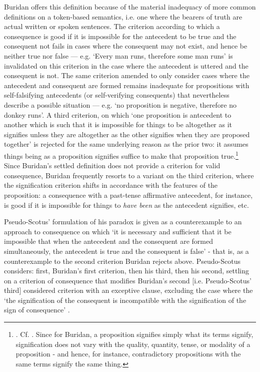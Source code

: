 	Buridan offers this definition because of the material inadequacy of more common definitions on a token-based semantics, i.e. one where the bearers of truth are actual written or spoken sentences. The criterion according to which a consequence is good if it is impossible for the antecedent to be true and the consequent not fails in cases where the consequent may not exist, and hence be neither true nor false --- e.g. `Every man runs, therefore some man runs' is invalidated on this criterion in the case where the antecedent is uttered and the consequent is not. The same criterion amended to only consider cases where the antecedent and consequent are formed remains inadequate for propositions with self-falsifying antecedents (or self-verifying consequents) that nevertheless describe a possible situation --- e.g. `no proposition is negative, therefore no donkey runs'. A third criterion, on which `one proposition is antecedent to another which is such that it is impossible for things to be altogether as it signifies unless they are altogether as the other signifies when they are proposed together' \cite[I. 3, p. 67]{Buridan2015} is rejected for the same underlying reason as the prior two: it assumes things being as a proposition signifies suffice to make that proposition true.\footnote{\cite[I. 1, p. 63]{Buridan2015}. Cf. \cite[pp. 854,  957-958]{BuridanKlimaSD}. Since for Buridan, a proposition signifies simply what its terms signify, signification does not vary with the quality, quantity, tense, or modality of a proposition - and hence, for instance, contradictory propositions with the same terms signify the same thing.} Since Buridan's settled definition does not provide a criterion for valid consequence, Buridan frequently resorts to a variant on the third criterion, where the signification criterion shifts in accordance with the features of the proposition: a consequence with a past-tense affirmative antecedent, for instance, is good if it is impossible for things to \textit{have been} as the antecedent signifies, etc.
			
	Pseudo-Scotus' formulation of his paradox is given as a counterexample to an approach to consequence on which `it is necessary and sufficient that it be impossible that when the antecedent and the consequent are formed simultaneously, the antecedent is true and the consequent is false' \cite[p. 226]{Pseudo-Scotus2001} - that is, as a counterexample to the second criterion Buridan rejects above. Pseudo-Scotus considers: first, Buridan's first criterion, then his third, then his second, settling on a criterion of consequence that modifies Buridan's second [i.e. Pseudo-Scotus' third] considered criterion with an exceptive clause, excluding the case where the `the signification of the consequent is incompatible with the signification of the sign of consequence' \cite[p. 228]{Pseudo-Scotus2001}.
	
